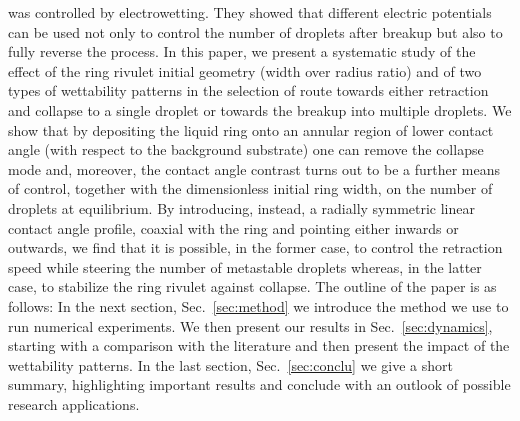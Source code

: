 \documentclass[twoside,twocolumn,9pt]{article}
\begin{document}
was controlled by electrowetting. They showed that different electric potentials can be used not only to control the number of droplets after breakup but also to fully reverse the process.
In this paper, we present a systematic study of the effect of the ring rivulet initial geometry (width over 
radius ratio) and of two types of wettability patterns in the 
selection of route towards either retraction and collapse to a single droplet or towards the breakup into multiple 
droplets. We show that by depositing the liquid ring onto an annular region of lower contact angle (with respect to the background substrate) one can remove the collapse mode and, moreover, the contact angle 
contrast turns out to be a further means of control, together with the dimensionless initial ring width,
on the number of droplets at equilibrium.
By introducing, instead, a radially symmetric linear contact angle profile, coaxial with the ring and pointing either inwards or outwards, we find that it is possible, in the former case, to control the retraction speed 
while steering the number of metastable droplets whereas, in the latter case, to stabilize the ring rivulet 
against collapse.
The outline of the paper is as follows: In the next section, Sec.~\ref{sec:method} we introduce the method we use to run numerical experiments.
We then present our results in Sec.~\ref{sec:dynamics}, starting with a comparison with the literature and then present the impact of the wettability patterns.
In the last section, Sec.~\ref{sec:conclu} we give a short summary, highlighting important results and conclude with an outlook of possible research applications.
\end{document}
